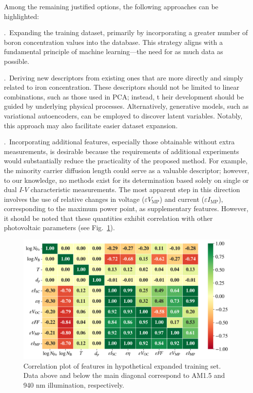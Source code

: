 \documentclass[a4paper,fleqn]{cas-sc}
\begin{document}
Among the remaining justified options, the following approaches can be highlighted:

.~Expanding the training dataset, primarily by incorporating a greater number of boron concentration values into the database.
This strategy aligns with a fundamental principle of machine learning—the need for as much data as possible.

.~Deriving new descriptors from existing ones that are more directly and simply related to iron concentration.
These descriptors should not be limited to linear combinations, such as those used in PCA; instead, t
heir development should be guided by underlying physical processes.
Alternatively, generative models, such as variational autoencoders,
can be employed to discover latent variables.
Notably, this approach may also facilitate easier dataset expansion.

.~Incorporating additional features, especially those obtainable without extra measurements,
is desirable because the requirements of additional experiments would substantially reduce
the practicality of the proposed method.
For example, the minority carrier diffusion length could serve as a valuable descriptor;
however, to our knowledge, no methods exist for its determination based solely
on single or dual $I$-$V$ characteristic measurements.
The most apparent step in this direction involves the use
of relative changes in voltage ($\varepsilon V_\mathrm{MP}$) and current ($\varepsilon I_\mathrm{MP}$),
corresponding to the maximum power point, as supplementary features.
However, it should be noted that these quantities exhibit correlation with other photovoltaic parameters (see Fig.~\ref{fig2}).

\begin{figure}
	\centering
     \includegraphics[width=0.8\linewidth]{Ris2.png}
	  \caption{Correlation plot of features in hypothetical expanded training set.
Data above and below the main diagonal correspond to AM1.5 and 940 nm illumination, respectively.
}\label{fig2}
\end{figure}
\end{document}
